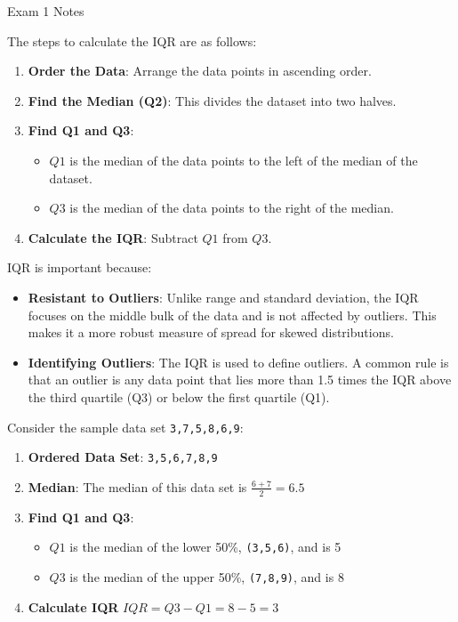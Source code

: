 \begin{examnotes}{Exam 1 Notes}
    \begin{highlight}
        The steps to calculate the IQR are as follows:
        \begin{enumerate}
            \item \textbf{Order the Data}: Arrange the data points in ascending order.
            \item \textbf{Find the Median (Q2)}: This divides the dataset into two halves.
            \item \textbf{Find Q1 and Q3}:
            \begin{itemize}
                \item $Q1$ is the median of the data points to the left of the median of the dataset.
                \item $Q3$ is the median of the data points to the right of the median.
            \end{itemize}
            \item \textbf{Calculate the IQR}: Subtract $Q1$ from $Q3$.
        \end{enumerate}
    \end{highlight}

    IQR is important because:
    \begin{itemize}
        \item \textbf{Resistant to Outliers}: Unlike range and standard deviation, the IQR focuses on the middle bulk of the data and is not affected by outliers. This makes it a more robust measure 
        of spread for skewed distributions.
        \item \textbf{Identifying Outliers}: The IQR is used to define outliers. A common rule is that an outlier is any data point that lies more than 1.5 times the IQR above the third quartile (Q3) 
        or below the first quartile (Q1).
    \end{itemize}

    \begin{highlight}
        Consider the sample data set \texttt{3,7,5,8,6,9}:

        \begin{enumerate}
            \item \textbf{Ordered Data Set}: \texttt{3,5,6,7,8,9}
            \item \textbf{Median}: The median of this data set is $\frac{6 + 7}{2} = 6.5$
            \item \textbf{Find Q1 and Q3}:
            \begin{itemize}
                \item $Q1$ is the median of the lower 50\%, \texttt{(3,5,6)}, and is 5
                \item $Q3$ is the median of the upper 50\%, \texttt{(7,8,9)}, and is 8
            \end{itemize}
            \item \textbf{Calculate IQR} $IQR = Q3 - Q1 = 8 - 5 = 3$
        \end{enumerate}
    \end{highlight}


\end{examnotes}
